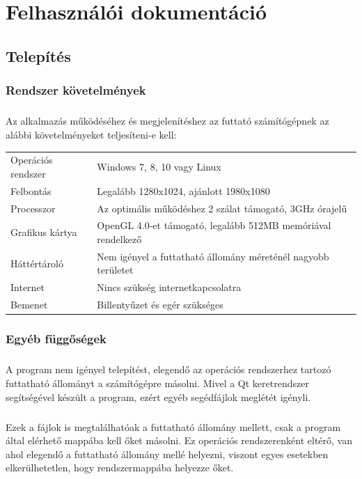 \documentclass[12pt]{report}
\begin{document}
\chapter{Felhasználói dokumentáció}
\section{Telepítés}
\subsection{Rendszer követelmények}
\paragraph{}
Az alkalmazás működéséhez és megjelenítéshez az futtató számítógépnek az alábbi követelményeket teljesíteni-e kell: \\
\begin{tabular}{l | l}
Operációs rendszer & Windows 7, 8, 10 vagy Linux \\
Felbontás & Legalább 1280x1024, ajánlott 1980x1080 \\
Processzor & Az optimális működéshez 2 szálat támogató, 3GHz órajelű \\
Grafikus kártya & OpenGL 4.0-et támogató, legalább 512MB memóriával rendelkező \\
Háttértároló & Nem igényel a futtatható állomány méreténél nagyobb területet \\
Internet & Nincs szükség internetkapcsolatra \\
Bemenet & Billentyűzet és egér szükséges
\end{tabular}
\subsection{Egyéb függőségek}
\paragraph{}
A program nem igényel telepítést, elegendő az operációs rendszerhez tartozó futtatható állományt a számítógépre másolni. Mivel a Qt keretrendszer segítségével készült a program, ezért egyéb segédfájlok meglétét igényli.
\paragraph{}
Ezek a fájlok is megtalálhatóak a futtatható állomány mellett, csak a program által elérhető mappába kell őket másolni. Ez operációs rendszerenként eltérő, van ahol elegendő a futtatható állomány mellé helyezni, viszont egyes esetekben elkerülhetetlen, hogy rendszermappába helyezze őket.
\end{document}
